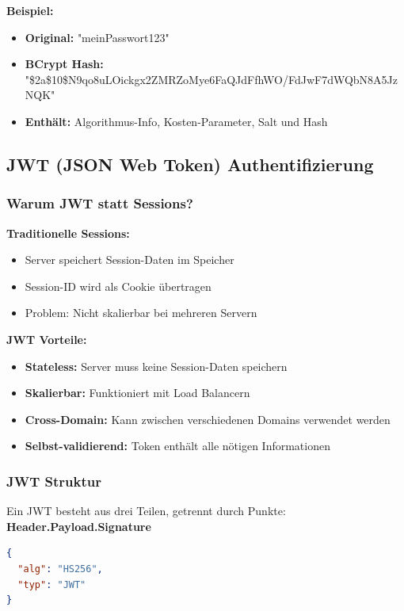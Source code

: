 \documentclass[a4paper,12pt]{article}
\begin{document}
\textbf{Beispiel:}
\begin{itemize}
    \item \textbf{Original:} "meinPasswort123"
    \item \textbf{BCrypt Hash:}
    "\$2a\$10\$N9qo8uLOickgx2ZMRZoMye6FaQJdFfhWO/FdJwF7dWQbN8A5JzNQK"
    \item \textbf{Enthält:} Algorithmus-Info, Kosten-Parameter, Salt und Hash
\end{itemize}

\subsection{JWT (JSON Web Token) Authentifizierung}

\subsubsection{Warum JWT statt Sessions?}

\textbf{Traditionelle Sessions:}
\begin{itemize}
    \item Server speichert Session-Daten im Speicher
    \item Session-ID wird als Cookie übertragen
    \item Problem: Nicht skalierbar bei mehreren Servern
\end{itemize}

\textbf{JWT Vorteile:}
\begin{itemize}
    \item \textbf{Stateless:} Server muss keine Session-Daten speichern
    \item \textbf{Skalierbar:} Funktioniert mit Load Balancern
    \item \textbf{Cross-Domain:} Kann zwischen verschiedenen Domains verwendet werden
    \item \textbf{Selbst-validierend:} Token enthält alle nötigen Informationen
\end{itemize}

\subsubsection{JWT Struktur}

Ein JWT besteht aus drei Teilen, getrennt durch Punkte:
\textbf{Header.Payload.Signature}

\begin{lstlisting}[language=JSON, caption=JWT Header (Base64 encoded)]
{
  "alg": "HS256",
  "typ": "JWT"
}
\end{lstlisting}
\end{document}
